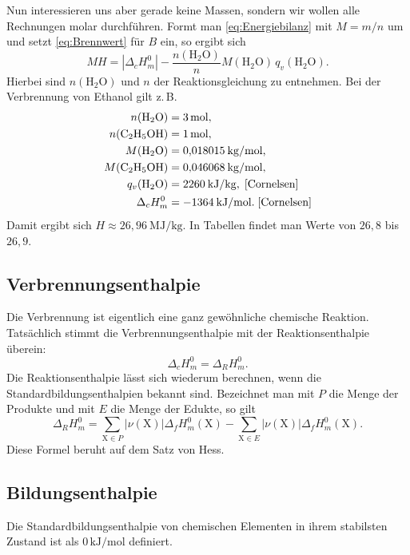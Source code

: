 \documentclass[a4paper,11pt,fleqn,twocolumn,dvipdfmx]{scrartcl}
\newcommand{\unit}[1]{\mathrm{#1}}
\begin{document}
Nun interessieren uns aber gerade keine Massen, sondern wir wollen
alle Rechnungen molar durchführen. Formt man
\eqref{eq:Energiebilanz} mit $M=m/n$ um und setzt \eqref{eq:Brennwert}
für $B$ ein, so ergibt sich%
\begin{equation}
MH = |\Delta_c H_m^0| - \frac{n(\mathrm{H_2O})}{n}
M(\mathrm{H_2O})\,q_v(\mathrm{H_2O}).
\end{equation}
Hierbei sind $n(\mathrm{H_2O})$ und $n$ der Reaktionsgleichung
zu entnehmen. Bei der Verbrennung von Ethanol gilt z.\,B.%
\[\begin{split}
n(\mathrm{H_2O}) &= 3\,\unit{mol},\\
n(\mathrm{C_2H_5OH}) &= 1\,\unit{mol},\\
M(\mathrm{H_2O}) &= 0{,}018015\:\unit{kg/mol},\\
M(\mathrm{C_2H_5OH}) &= 0{,}046068\:\unit{kg/mol},\\
q_v(\mathrm{H_2O}) &= 2260\:\unit{kJ/kg},\;\cite{Cornelsen}\\
\Delta_c H_m^0 &= -1364\:\unit{kJ/mol}.\;\cite{Cornelsen}
\end{split}
\]
Damit ergibt sich $H\approx 26{,}96\:\unit{MJ/kg}$.
In Tabellen findet man Werte von $26{,}8$ bis $26{,}9$.

\subsection{Verbrennungsenthalpie}
Die Verbrennung ist eigentlich eine ganz gewöhnliche
chemische Reaktion. Tatsächlich stimmt die Verbrennungsenthalpie
mit der Reaktionsenthalpie überein:%
\begin{equation}
\Delta_c H_m^0 = \Delta_R H_m^0.
\end{equation}
Die Reaktionsenthalpie lässt sich wiederum berechnen, wenn die
Standardbildungsenthalpien bekannt sind. Bezeichnet man mit
$P$ die Menge der Produkte und mit $E$ die Menge der Edukte, so gilt%
\begin{equation}
\Delta_R H_m^0 = \sum_{\mathrm X\in P}|\nu(\mathrm X)|\Delta_f H_m^0(\mathrm X)
- \sum_{\mathrm X\in E}|\nu(\mathrm X)|\Delta_f H_m^0(\mathrm X).
\end{equation}
Diese Formel beruht auf dem Satz von Hess.

\subsection{Bildungsenthalpie}
Die Standardbildungsenthalpie von chemischen Elementen
in ihrem stabilsten Zustand ist als $0\,\unit{kJ/mol}$ definiert.
\end{document}
